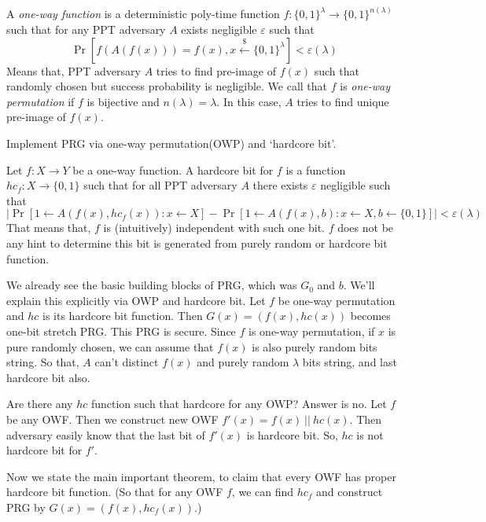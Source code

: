 \documentclass[12pt, a4paper, openany, twoside]{book}
\theoremstyle{definition}
\theoremstyle{remark}
\theoremstyle{plain}
\numberwithin{equation}{section}
\begin{document}
\begin{tcolorbox}[colback=yellow!10!white,colframe=brown!75!black,title=One Way Function]

A \textit{one-way function} is a deterministic poly-time function $f: \{0,1\}^\lambda \rightarrow \{0,1\}^{n(\lambda)}$ 
such that for any PPT adversary $A$ exists negligible $\varepsilon$ such that 
\[\Pr[f(A(f(x))) = f(x), x \xleftarrow{\$} \{0,1\}^\lambda] < \varepsilon(\lambda)\]
Means that, PPT adversary $A$ tries to find pre-image of $f(x)$ such that randomly chosen but success probability is negligible. 
We call that $f$ is \textit{one-way permutation} if $f$ is bijective and $n(\lambda) = \lambda$. In this case, 
$A$ tries to find unique pre-image of $f(x)$. 
\end{tcolorbox}

\begin{tcolorbox}[colback=yellow!10!white,colframe=orange!75!white,title=Goal of This Section]

Implement PRG via one-way permutation(OWP) and \lq hardcore bit'. 

\end{tcolorbox}

\begin{tcolorbox}[colback=yellow!10!white,colframe=brown!75!black,title=Hardcore bit]

Let $f: X \rightarrow Y$ be a one-way function. A hardcore bit for $f$ is a function $hc_f: X \rightarrow \{0,1\}$ 
such that for all PPT adversary $A$ there exists $\varepsilon$ negligible such that 
\[\bigg|\Pr[1 \gets A(f(x), hc_f(x)) : x \gets X] - \Pr[1 \gets A(f(x), b) : x \gets X, b \gets \{0,1\}]\bigg| < \varepsilon(\lambda)\]
That means that, $f$ is (intuitively) independent with such one bit. $f$ does not be any hint to determine this bit is 
generated from purely random or hardcore bit function. 
\end{tcolorbox}

We already see the basic building blocks of PRG, which was $G_0$ and $b$. We'll explain this explicitly via OWP and hardcore bit. 
Let $f$ be one-way permutation and $hc$ is its hardcore bit function. 
Then $G(x) = (f(x), hc(x))$ becomes one-bit stretch PRG. This PRG is secure. Since $f$ is one-way permutation, if $x$ is pure randomly chosen, 
we can assume that $f(x)$ is also purely random bits string. So that, $A$ can't distinct $f(x)$ and purely random $\lambda$ bits string, and 
last hardcore bit also. 

\begin{tcolorbox}[colback=yellow!10!white,colframe=gray!75!black,title=Remarks]

Are there any $hc$ function such that hardcore for any OWP? Answer is no. Let $f$ be any OWF. Then we construct 
new OWF $f'(x) = f(x) ~||~ hc(x)$. Then adversary easily know that the last bit of $f'(x)$ is hardcore bit. So, $hc$ is not hardcore bit for $f'$. 

\end{tcolorbox}
Now we state the main important theorem, to claim that every OWF has proper hardcore bit function. (So that for any OWF $f$, we can find $hc_f$ and construct PRG by $G(x) = (f(x), hc_f(x))$.) 
\end{document}
